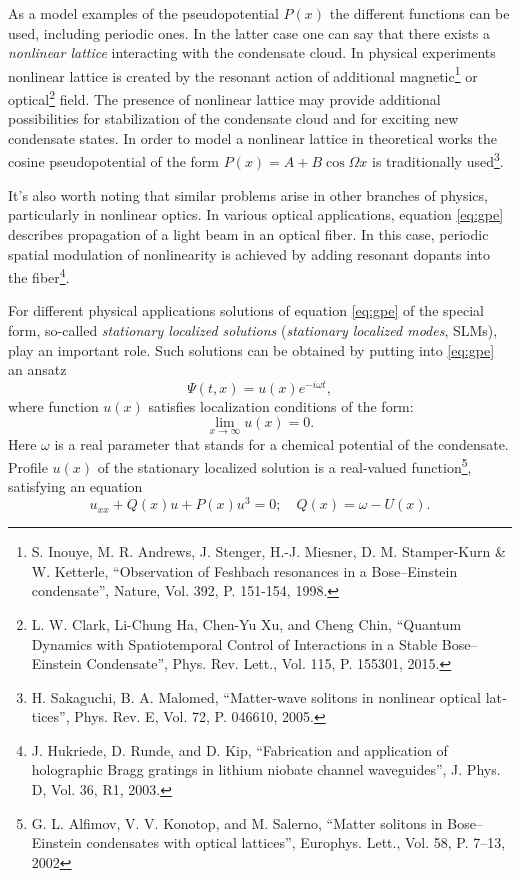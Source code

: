 \documentclass[candidate, href, colorlinks]{disser}
\begin{document}
As a model examples of the pseudopotential $P(x)$ the different functions can be used, including periodic ones.
In the latter case one can say that there exists a {\it nonlinear lattice} interacting with the condensate cloud.
In physical experiments nonlinear lattice is created by the resonant action of additional magnetic\footnote{S. Inouye, M. R. Andrews, J. Stenger, H.-J. Miesner, D. M. Stamper-Kurn \& W. Ketterle, ``Observation of Feshbach resonances in a Bose--Einstein condensate'', Nature, Vol. 392, P. 151-154, 1998.} or optical\footnote{L. W. Clark, Li-Chung Ha, Chen-Yu Xu, and Cheng Chin, ``Quantum Dynamics with Spatiotemporal Control of Interactions in a Stable Bose--Einstein Condensate'', Phys. Rev. Lett., Vol. 115, P. 155301, 2015.} field.
The presence of nonlinear lattice may provide additional possibilities for stabilization of the condensate cloud and for exciting new condensate states.
In order to model a nonlinear lattice in theoretical works the cosine pseudopotential of the form $P(x) = A + B \cos \Omega x$ is traditionally used\footnote{\label{note:malomed} H. Sakaguchi,  B. A. Malomed, ``Matter-wave solitons in nonlinear optical lat­tices'', Phys. Rev. E, Vol. 72, P. 046610, 2005.}.

It's also worth noting that similar problems arise in other branches of physics, particularly in nonlinear optics. 
In various optical applications, equation \eqref{eq:gpe} describes propagation of a light beam in an optical fiber.
In this case, periodic spatial modulation of nonlinearity is achieved by adding resonant dopants into the fiber\footnote{J. Hukriede, D. Runde, and D. Kip, ``Fabrication and application of holographic Bragg gratings in lithium niobate channel waveguides'', J. Phys. D, Vol. 36, R1, 2003.}.

For different physical applications solutions of equation \eqref{eq:gpe} of the special form, so-called {\it stationary localized solutions} ({\it stationary localized modes}, SLMs), play an important role.
Such solutions can be obtained by putting into \eqref{eq:gpe} an ansatz
\begin{equation}
	\Psi(t, x) = u(x) e^{-i \omega t},
\label{eq:ansatz}
\end{equation}
where function $u(x)$ satisfies localization conditions of the form:
\begin{equation}
	\lim \limits_{x \to \infty} u(x) = 0.
\label{eq:localization}
\end{equation}
Here $\omega$ is a real parameter that stands for a chemical potential of the condensate.
Profile $u(x)$ of the stationary localized solution is a real-valued function\footnote{G. L. Alfimov, V. V. Konotop, and M. Salerno, ``Matter solitons in Bose--Einstein condensates with optical lattices'', Europhys. Lett., Vol. 58, P. 7--13, 2002}, satisfying an equation
\begin{equation}
	u_{xx} + Q(x) u + P(x) u^3 = 0; \quad Q(x) = \omega - U(x).
\label{eq:stationary}
\end{equation}
\end{document}
